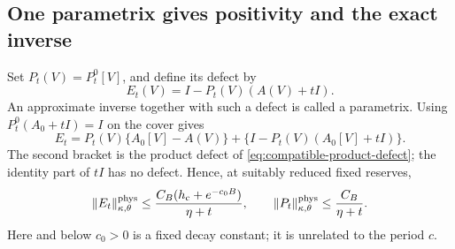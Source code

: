 \documentclass[11pt,reqno]{amsart}
\numberwithin{equation}{section}
\theoremstyle{definition}
\theoremstyle{remark}
\begin{document}
\subsection{One parametrix gives positivity and the exact inverse}

Set \(P_t(V)=P_t^0[V]\), and define its defect by
\[
                  E_t(V)=I-P_t(V)(A(V)+tI).
\]
An approximate inverse together with such a
defect is called a parametrix.
Using \(P_t^0(A_0+tI)=I\) on the cover gives
\[
 E_t=P_t(V)\{A_0[V]-A(V)\}
                  +\{I-P_t(V)(A_0[V]+tI)\}.
\]
The second bracket is the product defect
of \eqref{eq:compatible-product-defect};
the identity part of \(tI\) has no defect.
Hence, at suitably reduced fixed reserves,
\begin{equation}
       \|E_t\|_{\kappa,\theta}^{\rm phys}
         \le\frac{C_B(h_{\rm c}+e^{-c_0B})}{\eta+t},
       \qquad
       \|P_t\|_{\kappa,\theta}^{\rm phys}
                            \le\frac{C_B}{\eta+t}.
 \label{eq:compatible-parametrix-price}
\end{equation}
Here and below \(c_0>0\) is a fixed decay
constant; it is unrelated to the period \(c\).
\end{document}
